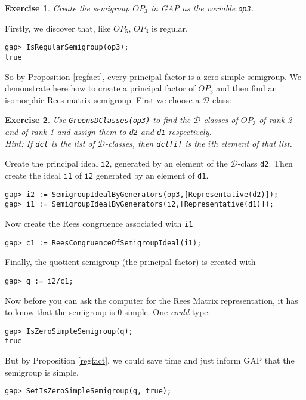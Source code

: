 \documentclass{ws-p8-50x6-00}
\theoremstyle{plain} \newtheorem{Thm}{Theorem}
\theoremstyle{plain} \newtheorem{Cor}{Corollary}
\theoremstyle{plain} \newtheorem{Lemma}{Lemma}
\theoremstyle{plain} \newtheorem{Prop}{Proposition}
\theoremstyle{plain} \newtheorem{Ex}{Exercise}
\def\gap{\sf GAP}
\def\d{${\mathcal{D}}$}
\begin{document}
\begin{Ex}
Create the semigroup $OP_3$ in {\gap} as the variable {\tt op3}.
\end{Ex}
Firstly, we discover that, like $OP_5$,  $OP_3$ is regular.
\begin{verbatim}
gap> IsRegularSemigroup(op3);
true
\end{verbatim}
So by Proposition \ref{regfact}, every principal factor is 
a zero simple semigroup.
We demonstrate here how to create a principal factor of
$OP_3$ and then find an isomorphic Rees matrix semigroup.
First we choose a \d-class:
\begin{Ex}
Use {\tt GreensDClasses(op3)} 
to find the \d-classes of $OP_3$
of rank 2 and of rank 1 and assign them to 
{\tt d2} and {\tt d1} respectively.\\
{\rm Hint: If {\tt dcl} is the list of \d-classes, then
{\tt dcl[i]} is the $i$th element of that list.}
\end{Ex}

Create the principal ideal {\tt i2}, generated by an element of
the \d-class {\tt d2}.
Then create the ideal {\tt i1}  of {\tt i2} generated by an element of
{\tt d1}.
\begin{verbatim}
gap> i2 := SemigroupIdealByGenerators(op3,[Representative(d2)]);
gap> i1 := SemigroupIdealByGenerators(i2,[Representative(d1)]);
\end{verbatim}

Now create the Rees congruence associated with {\tt i1}
\begin{verbatim}
gap> c1 := ReesCongruenceOfSemigroupIdeal(i1);
\end{verbatim}

Finally, the quotient semigroup (the principal factor) is created with
\begin{verbatim}
gap> q := i2/c1;

\end{verbatim}

Now before you can ask the computer for the Rees Matrix 
representation, it has to know that the semigroup is $0$-simple.
One {\em could} type:
\begin{verbatim}
gap> IsZeroSimpleSemigroup(q);
true
\end{verbatim}
But by Proposition \ref{regfact}, we could save time and just inform {\gap}
that the semigroup is simple.
\begin{verbatim}
gap> SetIsZeroSimpleSemigroup(q, true);
\end{verbatim}
\end{document}
